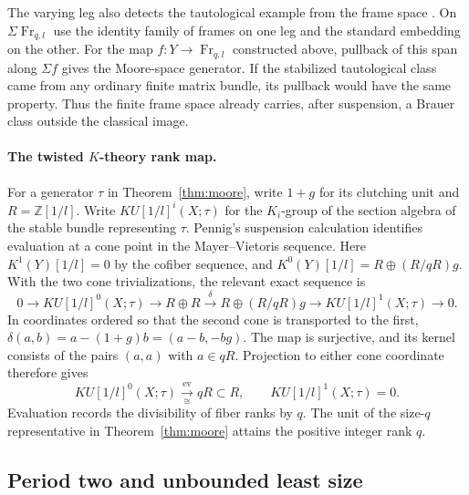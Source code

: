 \documentclass[11pt]{article}
\DeclareMathOperator{\Fr}{Fr}
\newcommand{\Z}{\mathbb Z}
\begin{document}
The varying leg also detects the tautological example from the frame space \cite[Example~3.6]{ErshovLAB}. On \(\Sigma\Fr_{q,l}\) use the identity family of frames on one leg and the standard embedding on the other. For the map \(f:Y\to\Fr_{q,l}\) constructed above, pullback of this span along \(\Sigma f\) gives the Moore-space generator. If the stabilized tautological class came from any ordinary finite matrix bundle, its pullback would have the same property. Thus the finite frame space already carries, after suspension, a Brauer class outside the classical image.

\paragraph{The twisted \(K\)-theory rank map.}
For a generator \(\tau\) in Theorem~\ref{thm:moore}, write \(1+g\) for
its clutching unit and \(R=\Z[1/l]\). Write \(KU[1/l]^i(X;\tau)\)
for the \(K_i\)-group of the section algebra of the stable bundle
representing \(\tau\). Pennig's suspension calculation
\cite[Theorem~4.5]{Pennig} identifies evaluation at a cone point
in the Mayer--Vietoris sequence. Here \(K^1(Y)[1/l]=0\) by the
cofiber sequence, and \(K^0(Y)[1/l]=R\oplus(R/qR)g\). With the two
cone trivializations, the relevant exact sequence is
\[
 0\longrightarrow KU[1/l]^0(X;\tau)\longrightarrow R\oplus R
 \xrightarrow{\ \delta\ } R\oplus(R/qR)g
 \longrightarrow KU[1/l]^1(X;\tau)\longrightarrow 0 .
\]
In coordinates ordered so that the second cone is transported to
the first, \(\delta(a,b)=a-(1+g)b=(a-b,-bg)\).
The map is surjective, and its kernel consists of the pairs
\((a,a)\) with \(a\in qR\). Projection to either cone coordinate
therefore gives
\[
 KU[1/l]^0(X;\tau)\xrightarrow[\cong]{\ \mathrm{ev}\ }qR\subset R,
 \qquad KU[1/l]^1(X;\tau)=0 .
\]
Evaluation records the divisibility of fiber ranks by \(q\).
The unit of the size-\(q\) representative in Theorem~\ref{thm:moore}
attains the positive integer rank \(q\).

\subsection{Period two and unbounded least size}
\end{document}
